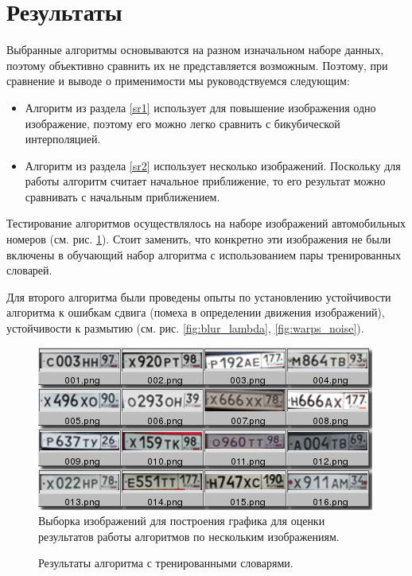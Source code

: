 \section{Результаты}
 Выбранные алгоритмы основываются на разном изначальном наборе данных, поэтому объективно сравнить их не представляется
 возможным. Поэтому, при сравнение и выводе о применимости мы руководствуемся следующим:
 \begin{itemize}
   \item Алгоритм из раздела \ref{sr1} использует для повышение изображения одно изображение, поэтому  его можно легко
     сравнить с бикубической интерполяцией.
   \item Алгоритм из раздела \ref{sr2} использует несколько изображений. Поскольку для работы алгоритм считает начальное
     приближение, то его результат можно сравнивать с начальным приближением.
 \end{itemize}

Тестирование алгоритмов осуществлялось на наборе изображений автомобильных номеров (см. рис. \ref{fig:samples}). Стоит
заменить, что конкретно эти изображения не были включены в обучающий набор алгоритма с использованием пары тренированных
словарей.

Для второго алгоритма были проведены опыты по установлению устойчивости алгоритма к ошибкам сдвига (помеха в определении
движения изображений), устойчивости к размытию (см. рис. \ref{fig:blur_lambda}, \ref{fig:warps_noise}).

\begin{figure}[h]
  \begin{center}
    \includegraphics{../presentation/content/out_sr1.png}
  \end{center}
  \caption{Выборка изображений для построения графика для оценки результатов работы алгоритмов по нескольким
  изображениям.}
  \label{fig:samples}
\end{figure}

\begin{figure}[p]
  \centering
  
  \caption{Результаты алгоритма с тренированными словарями.  }
  \label{fig:plot_sr1}
\end{figure}

